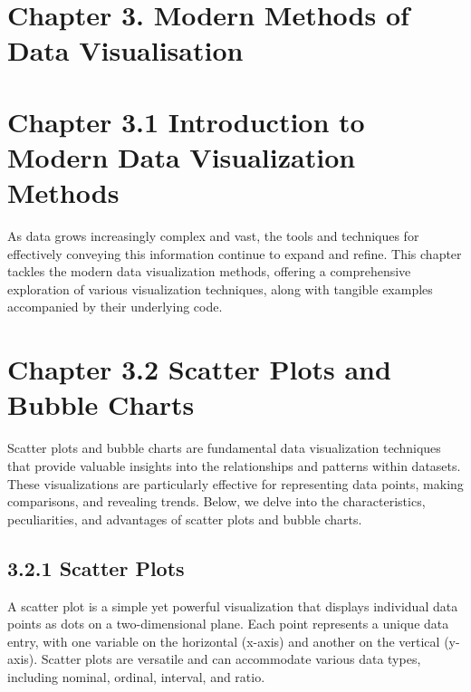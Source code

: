 \documentclass{article}\usepackage[]{graphicx}\usepackage[]{xcolor}
\makeatletter
\newenvironment{kframe}{%
 \def\at@end@of@kframe{}%
 \ifinner\ifhmode%
  \def\at@end@of@kframe{\end{minipage}}%
  \begin{minipage}{\columnwidth}%
 \fi\fi%
 \def\FrameCommand##1{\hskip\@totalleftmargin \hskip-\fboxsep
 \colorbox{shadecolor}{##1}\hskip-\fboxsep
     \hskip-\linewidth \hskip-\@totalleftmargin \hskip\columnwidth}%
 \MakeFramed {\advance\hsize-\width
   \@totalleftmargin\z@ \linewidth\hsize
   \@setminipage}}%
 {\par\unskip\endMakeFramed%
 \at@end@of@kframe}
\newenvironment{knitrout}{}{} %
\makeatother
\begin{document}
\begin{knitrout}
\color{fgcolor}\begin{kframe}


{\ttfamily\noindent\bfseries\color{errorcolor}{\#\# Error in library(forecast): there is no package called 'forecast'}}\end{kframe}
\end{knitrout}

\section{Chapter 3. Modern Methods of Data Visualisation}

\section{Chapter 3.1 Introduction to Modern Data Visualization Methods}
As data grows increasingly complex and vast, the tools and techniques for effectively conveying this information continue to expand and refine. This chapter tackles the modern data visualization methods, offering a comprehensive exploration of various visualization techniques, along with tangible examples accompanied by their underlying code.

\section{Chapter 3.2 Scatter Plots and Bubble Charts}
Scatter plots and bubble charts are fundamental data visualization techniques that provide valuable insights into the relationships and patterns within datasets. These visualizations are particularly effective for representing data points, making comparisons, and revealing trends. Below, we delve into the characteristics, peculiarities, and advantages of scatter plots and bubble charts.

\subsection{3.2.1 Scatter Plots}
A scatter plot is a simple yet powerful visualization that displays individual data points as dots on a two-dimensional plane. Each point represents a unique data entry, with one variable on the horizontal (x-axis) and another on the vertical (y-axis). Scatter plots are versatile and can accommodate various data types, including nominal, ordinal, interval, and ratio.
\end{document}
